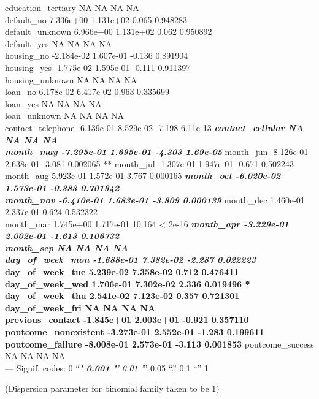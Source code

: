 \documentclass[english,man]{apa6}
\begin{document}
education\_tertiary NA NA NA NA\\
default\_no 7.336e+00 1.131e+02 0.065 0.948283\\
default\_unknown 6.966e+00 1.131e+02 0.062 0.950892\\
default\_yes NA NA NA NA\\
housing\_no -2.184e-02 1.607e-01 -0.136 0.891904\\
housing\_yes -1.775e-02 1.595e-01 -0.111 0.911397\\
housing\_unknown NA NA NA NA\\
loan\_no 6.178e-02 6.417e-02 0.963 0.335699\\
loan\_yes NA NA NA NA\\
loan\_unknown NA NA NA NA\\
contact\_telephone -6.139e-01 8.529e-02 -7.198 6.11e-13 \textbf{\emph{
contact\_cellular NA NA NA NA\\
month\_may -7.295e-01 1.695e-01 -4.303 1.69e-05 }} month\_jun -8.126e-01
2.638e-01 -3.081 0.002065 ** month\_jul -1.307e-01 1.947e-01 -0.671
0.502243\\
month\_aug 5.923e-01 1.572e-01 3.767 0.000165 \textbf{\emph{ month\_oct
-6.020e-02 1.573e-01 -0.383 0.701942\\
month\_nov -6.410e-01 1.683e-01 -3.809 0.000139 }} month\_dec 1.460e-01
2.337e-01 0.624 0.532322\\
month\_mar 1.745e+00 1.717e-01 10.164 \textless{} 2e-16 \textbf{\emph{
month\_apr -3.229e-01 2.002e-01 -1.613 0.106732\\
month\_sep NA NA NA NA\\
day\_of\_week\_mon -1.688e-01 7.382e-02 -2.287 0.022223 }\\
day\_of\_week\_tue 5.239e-02 7.358e-02 0.712 0.476411\\
day\_of\_week\_wed 1.706e-01 7.302e-02 2.336 0.019496 *\\
day\_of\_week\_thu 2.541e-02 7.123e-02 0.357 0.721301\\
day\_of\_week\_fri NA NA NA NA\\
previous\_contact -1.845e+01 2.003e+01 -0.921 0.357110\\
poutcome\_nonexistent -3.273e-01 2.552e-01 -1.283 0.199611\\
poutcome\_failure -8.008e-01 2.573e-01 -3.113 0.001853 }
poutcome\_success NA NA NA NA\\
--- Signif. codes: 0 \enquote{\emph{\textbf{' 0.001 '}' 0.01 '}} 0.05
\enquote{.} 0.1 \enquote{} 1

(Dispersion parameter for binomial family taken to be 1)
\end{document}
